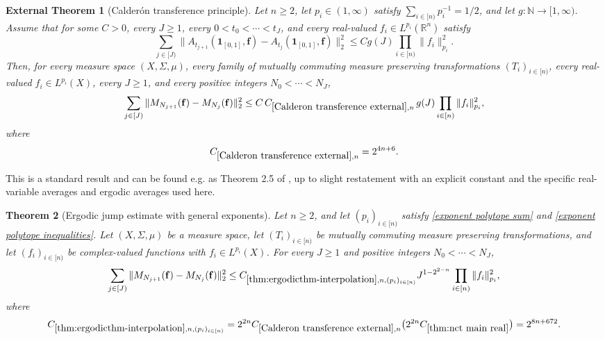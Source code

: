 \documentclass[12pt,reqno]{amsart}
\theoremstyle{plain}
\newtheorem{theorem}{Theorem}[section]
\newtheorem{exttheorem}[theorem]{External Theorem}
\numberwithin{equation}{section}
\theoremstyle{remark}
\newcommand{\uses}[1]{}
\newcommand{\usesdefs}[1]{}
\newcommand{\leanok}{}
\newcommand{\lean}[1]{}
\newcommand{\R}{{\mathbb R}}
\newcommand{\N}{{\mathbb N}}
\begin{document}
\begin{exttheorem}[Calder\'on transference principle]\label{Calderon transference external}\lean{Auto.calderon_transference_external}\leanok\uses{}\usesdefs{ergodic averages,A_def}
Let $n\ge2$, let $p_i\in(1,\infty)$ satisfy $\sum_{i\in[n)}p_i^{-1}=1/2$, and let $g:\N\to[1,\infty)$. Assume that for some $C>0$, every $J\ge1$, every $0<t_0<\cdots<t_J$, and every real-valued $f_i\in L^{p_i}(\R^n)$ satisfy
\begin{equation}\label{Calderon transference assumption}
\sum_{j\in[J)}\|A_{t_{j+1}}(\mathbf1_{[0,1]},\mathbf f)-A_{t_j}(\mathbf1_{[0,1]},\mathbf f)\|_2^2
\le Cg(J)\prod_{i\in[n)}\|f_i\|_{p_i}^2.
\end{equation}
Then, for every measure space $(X,\Sigma,\mu)$, every family of mutually commuting measure preserving transformations $(T_i)_{i\in[n)}$, every real-valued $f_i\in L^{p_i}(X)$, every $J\ge1$, and every positive integers $N_0<\cdots<N_J$,
\begin{equation}\label{Calderon transference conclusion}
\sum_{j\in[J)}\|M_{N_{j+1}}(\mathbf f)-M_{N_j}(\mathbf f)\|_2^2
\le C\,C_{\ref{Calderon transference external},n}\,g(J)
\prod_{i\in[n)}\|f_i\|_{p_i}^2,
\end{equation}
where
\begin{equation}\label{Calderon transference constant}
C_{\ref{Calderon transference external},n}
=
2^{4n+6}.
\end{equation}
\end{exttheorem}
This is a standard result and can be found e.g. as Theorem 2.5 of \cite{Pernegger2025}, up to slight restatement with an explicit constant and the specific real-variable averages and ergodic averages used here.
\begin{theorem}[Ergodic jump estimate with general exponents]\label{thm:ergodicthm-interpolation}\lean{Auto.ergodic_jump_estimate_interpolation}\leanok\uses{interpolated real variable estimate,Calderon transference external}\usesdefs{ergodic averages}
Let $n\ge2$, and let $(p_i)_{i\in[n)}$ satisfy \eqref{exponent polytope sum} and \eqref{exponent polytope inequalities}. Let $(X,\Sigma,\mu)$ be a measure space, let $(T_i)_{i\in[n)}$ be mutually commuting measure preserving transformations, and let $(f_i)_{i\in[n)}$ be complex-valued functions with $f_i\in L^{p_i}(X)$. For every $J\ge1$ and positive integers $N_0<\cdots<N_J$,
\begin{equation}\label{ergodic jump general exponents}
\sum_{j\in[J)}\|M_{N_{j+1}}(\mathbf f)-M_{N_j}(\mathbf f)\|_2^2
\le C_{\ref{thm:ergodicthm-interpolation},n,(p_i)_{i\in[n)}}J^{1-2^{2-n}}
\prod_{i\in[n)}\|f_i\|_{p_i}^2,
\end{equation}
where
\begin{equation}\label{ergodic interpolation constant}
C_{\ref{thm:ergodicthm-interpolation},n,(p_i)_{i\in[n)}}
=2^{2n}C_{\ref{Calderon transference external},n}
\bigl(2^{2n}C_{\ref{thm:nct main real}}\bigr)
=2^{8n+672}.
\end{equation}
\end{theorem}
\end{document}
